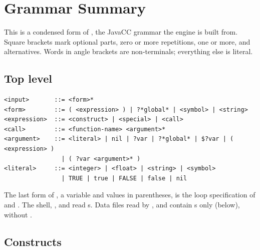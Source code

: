 \chapter{Grammar Summary}
\label{app:grammar}

This is a condensed form of , the JavaCC
grammar the engine is built from. Square brackets mark optional parts,
\fn{*} zero or more repetitions, \fn{+} one or more, and \fn{|}
alternatives. Words in angle brackets are non-terminals; everything else
is literal.

\section{Top level}

\begin{lstlisting}[style=shell]
<input>       ::= <form>*
<form>        ::= ( <expression> ) | ?*global* | <symbol> | <string>
<expression>  ::= <construct> | <special> | <call>
<call>        ::= <function-name> <argument>*
<argument>    ::= <literal> | nil | ?var | ?*global* | $?var | ( <expression> )
                | ( ?var <argument>* )
<literal>     ::= <integer> | <float> | <string> | <symbol>
                | TRUE | true | FALSE | false | nil
\end{lstlisting}

The last form of , a variable and values in parentheses, is
the loop specification of  and .
The shell, ,  and  read s.
Data files read by ,  and 
contain s only (below), without .

\section{Constructs}

